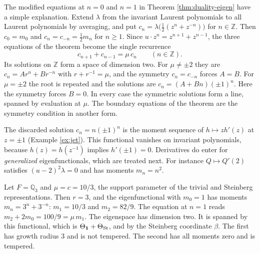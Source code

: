 \begin{remark}\label{rem:bilateral-recurrence}
The modified equations at $n=0$ and $n=1$ in Theorem \ref{thm:duality-eigen} have a simple explanation. Extend $\lambda$ from the invariant Laurent polynomials to all Laurent polynomials by averaging, and put $c_n=\lambda\bigl(\tfrac12(z^n+z^{-n})\bigr)$ for $n\in\mathbb Z$. Then $c_0=m_0$ and $c_n=c_{-n}=\tfrac12m_n$ for $n\ge1$. Since $u\cdot z^n=z^{n+1}+z^{n-1}$, the three equations of the theorem become the single recurrence
\[
c_{n+1}+c_{n-1}=\mu\,c_n\qquad(n\in\mathbb Z).
\]
Its solutions on $\mathbb Z$ form a space of dimension two. For $\mu\ne\pm2$ they are $c_n=Ar^n+Br^{-n}$ with $r+r^{-1}=\mu$, and the symmetry $c_n=c_{-n}$ forces $A=B$. For $\mu=\pm2$ the root is repeated and the solutions are $c_n=(A+Bn)(\pm1)^n$. Here the symmetry forces $B=0$. In every case the symmetric solutions form a line, spanned by evaluation at $\mu$. The boundary equations of the theorem are the symmetry condition in another form.

The discarded solution $c_n=n(\pm1)^n$ is the moment sequence of $h\mapsto zh'(z)$ at $z=\pm1$ (Example \ref{ex:jet}). This functional vanishes on invariant polynomials, because $h(z)=h(z^{-1})$ implies $h'(\pm1)=0$. Derivatives do enter for \emph{generalized} eigenfunctionals, which are treated next. For instance $Q\mapsto Q'(2)$ satisfies $(u-2)^2\lambda=0$ and has moments $m_n=n^2$.
\end{remark}
\begin{example}\label{ex:q3-recurrence}
Let $F=\mathbb Q_3$ and $\mu=c=10/3$, the support parameter of the trivial and Steinberg representations. Then $r=3$, and the eigenfunctional with $m_0=1$ has moments $m_n=3^n+3^{-n}$: $m_1=10/3$ and $m_2=82/9$. The equation at $n=1$ reads $m_2+2m_0=100/9=\mu\,m_1$. The eigenspace has dimension two. It is spanned by this functional, which is $\Theta_{\mathbf 1}+\Theta_{\operatorname{St}}$, and by the Steinberg coordinate $\beta$. The first has growth radius $3$ and is not tempered. The second has all moments zero and is tempered.
\end{example}

